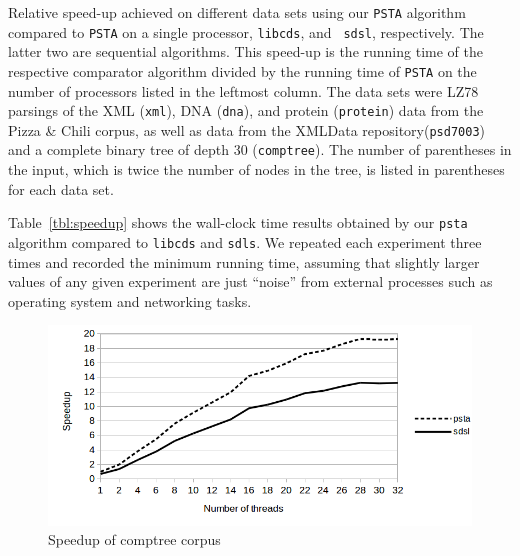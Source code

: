 \begin{table}[ht]
\caption[]{Relative speed-up achieved on different data sets using our {\tt PSTA}
  algorithm compared to {\tt PSTA} on a single processor, {\tt libcds}, and {\tt
    sdsl}, respectively.
  The latter two are sequential algorithms.
  This speed-up is the running time of the respective comparator algorithm
  divided by the running time of {\tt PSTA} on the number of processors listed
  in the leftmost column.
  The data sets were LZ78 parsings of the XML ({\tt xml}), DNA ({\tt dna}), and
  protein ({\tt protein}) data from the Pizza \& Chili
  corpus\footnotemark[\value{pizzachili}], as well as data from the XMLData
  repository\footnotemark[\value{xmldata}] ({\tt psd7003}) and a complete binary tree of
  depth 30 ({\tt comptree}).
  The number of parentheses in the input, which is twice the number of nodes in
  the tree, is listed in parentheses for each data set.}
\label{tbl:speedup}
\end{table}

Table~\ref{tbl:speedup} shows the wall-clock time results obtained by
our {\tt psta} algorithm compared to \verb+libcds+ and \verb+sdls+.
We repeated each experiment three times and recorded the minimum
running time, assuming that slightly larger values of any given
experiment are just ``noise'' from external processes such as
operating system and networking tasks.

\begin{figure}[ht]
  \centering
  \includegraphics[scale=0.3]{./images/Speedup.png}
  \caption{Speedup of comptree corpus}
  \label{fig:speedup}
\end{figure}


